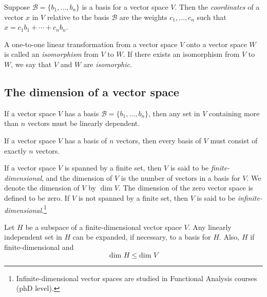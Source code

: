 \documentclass{article}
\begin{document}
\begin{defn}
    Suppose \(\mathcal{B} = \{b_1, \ldots, b_n\}\) is a basis for a vector space \(V\). Then the \emph{coordinates} of a vector \(x\) in \(V\) relative to the basis \(\mathcal{B}\) are the weights \(c_1, \ldots, c_n\) such that \(x = c_1b_1 + \cdots + c_nb_n\).
\end{defn}

\begin{defn}
    A one-to-one linear transformation from a vector space \(V\) onto a vector space \(W\) is called an \emph{isomorphism} from \(V\) to \(W\). If there exists an isomorphism from \(V\) to \(W\), we say that \(V\) and \(W\) are \emph{isomorphic}.
\end{defn}

\subsection{The dimension of a vector space}

\begin{thm}
    If a vector space \(V\) has a basis \(\mathcal{B}=\{b_1,\ldots,b_n\}\), then any set in \(V\) containing more than \(n\) vectors must be linearly dependent.
\end{thm}

\begin{thm}
    If a vector space \(V\) has a basis of \(n\) vectors, then every basis of \(V\) must consist of exactly \(n\) vectors.
\end{thm}

\begin{defn}
    If a vector space \(V\) is spanned by a finite set, then \(V\) is said to be \emph{finite-dimensional}, and the dimension of \(V\) is the number of vectors in a basis for \(V\). We denote the dimension of \(V\) by \(\dim V\). The dimension of the zero vector space is defined to be zero. If \(V\) is not spanned by a finite set, then \(V\) is said to be \emph{infinite-dimensional}.\footnote{Infinite-dimensional vector spaces are studied in Functional Analysis courses (phD level).}
\end{defn}

\begin{thm} 
    Let \(H\) be a subspace of a finite-dimensional vector space \(V\). Any linearly independent set in \(H\) can be expanded, if necessary, to a basis for \(H\). Also, \(H\) if finite-dimensional and \[\text{dim } H\leq\text{dim }V\]
\end{thm}
\end{document}
